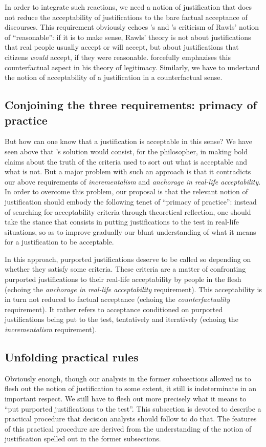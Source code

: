 \documentclass[preprint, french, english, 11pt, authoryear]{elsarticle}%
\begin{document}
In order to integrate such reactions, we need a notion of justification that does not reduce the acceptability of justifications to the bare factual acceptance of discourses. This requirement obviously echoes \cite{habermas_reconciliation_1995}'s and \cite{estlund_democratic_2009}'s criticism of Rawls' notion of “reasonable”: if it is to make sense, Rawls' theory is not about justifications that real people usually accept or will accept, but about justifications that citizens \emph{would} accept, if they were reasonable. \citet{habermas_faktizitat_1992} forcefully emphazises this counterfactual aspect in his theory of legitimacy. Similarly, we have to undertand the notion of acceptability of a justification in a counterfactual sense. 

\subsection{Conjoining the three requirements: primacy of practice}
But how can one know that a justification is acceptable in this sense? We have seen above that \cite{estlund_democratic_2009}'s solution would consist, for the philosopher, in making bold claims about the truth of the criteria used to sort out what is acceptable and what is not. But a major problem with such an approach is that it contradicts our above requirements of \emph{incrementalism} and \emph{anchorage in real-life acceptability}. In order to overcome this problem, our proposal is that the relevant notion of justification should embody the following tenet of “primacy of practice”: instead of searching for acceptability criteria through theoretical reflection, one should take the stance that consists in putting justifications to the test in real-life situations, so as to improve gradually our blunt understanding of what it means for a justification to be acceptable.

In this approach, purported justifications deserve to be called so depending on whether they satisfy some criteria. These criteria are a matter of confronting purported justifications to their real-life acceptability by people in the flesh (echoing the \emph{anchorage in real-life acceptability} requirement). This acceptability is in turn not reduced to factual acceptance (echoing the \emph{counterfactuality} requirement). It rather refers to acceptance conditioned on purported justifications being put to the test, tentatively and iteratively (echoing the \emph{incrementalism} requirement).

\subsection{Unfolding practical rules}
Obviously enough, though our analysis in the former subsections allowed us to flesh out the notion of justification to some extent, it still is indeterminate in an important respect. We still have to flesh out more precisely what it means to ``put purported justifications to the test''. This subsection is devoted to describe a practical procedure that decision analysts should follow to do that. The features of this practical procedure are derived from the understanding of the notion of justification spelled out in the former subsections.
\end{document}
